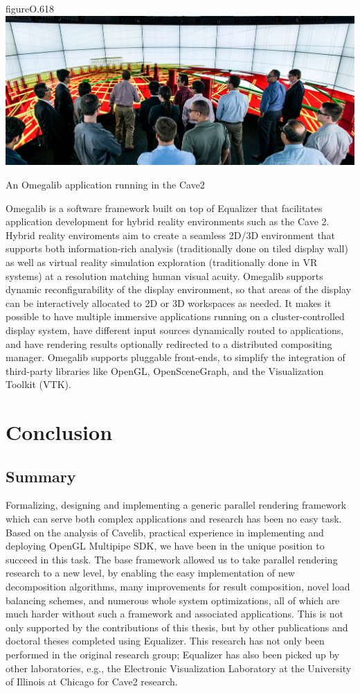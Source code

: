 \begin{wrapfloat}{figure}{O}{.618\textwidth}
  \includegraphics[width=.618\textwidth]{images/omegalib}
  {\caption{\label{fOmegalib}An Omegalib application running in the Cave2}}
\end{wrapfloat}

Omegalib \cite{Omegalib} is a software framework built on top of Equalizer that
facilitates application development for hybrid reality environments such as the
Cave 2. Hybrid reality enviroments aim to create a seamless 2D/3D environment
that supports both information-rich analysis (traditionally done on tiled
display wall) as well as virtual reality simulation exploration (traditionally
done in VR systems) at a resolution matching human visual acuity. Omegalib
supports dynamic reconfigurability of the display environment, so that areas of
the display can be interactively allocated to 2D or 3D workspaces as needed. It
makes it possible to have multiple immersive applications running on a
cluster-controlled display system, have different input sources dynamically
routed to applications, and have rendering results optionally redirected to a
distributed compositing manager. Omegalib supports pluggable front-ends, to
simplify the integration of third-party libraries like OpenGL, OpenSceneGraph,
and the Visualization Toolkit (VTK).


\chapter{Conclusion}\label{sConclusion}

\section{Summary}

Formalizing, designing and implementing a generic parallel rendering framework
which can serve both complex applications and research has been no easy task.
Based on the analysis of Cavelib, practical experience in implementing and
deploying OpenGL Multipipe SDK, we have been in the unique position to succeed
in this task. The base framework allowed us to take parallel rendering research
to a new level, by enabling the easy implementation of new decomposition
algorithms, many improvements for result composition, novel load balancing
schemes, and numerous whole system optimizations, all of which are much harder
without such a framework and associated applications. This is not only
supported by the contributions of this thesis, but by other publications and
doctoral theses completed using Equalizer. This research has not only been
performed in the original research group; Equalizer has also been picked up by
other laboratories, e.g., the Electronic Visualization Laboratory at the
University of Illinois at Chicago for Cave2 research.

